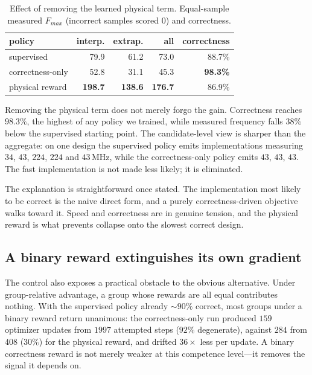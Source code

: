 \documentclass[journal]{IEEEtran}
\newcommand{\fmax}{$F_{\mathit{max}}$}
\begin{document}
\begin{table}[t]
\caption{Effect of removing the learned physical term. Equal-sample measured
\fmax{} (incorrect samples scored $0$) and correctness.}
\label{tab:ablation}
\centering
\small
\begin{tabular}{lrrrr}
\toprule
policy & interp. & extrap. & all & correctness \\
\midrule
supervised          &  79.9 &  61.2 &  73.0 & 88.7\% \\
correctness-only    &  52.8 &  31.1 &  45.3 & \textbf{98.3\%} \\
physical reward     & \textbf{198.7} & \textbf{138.6} & \textbf{176.7} & 86.9\% \\
\bottomrule
\end{tabular}
\end{table}

Removing the physical term does not merely forgo the gain. Correctness reaches
$98.3\%$, the highest of any policy we trained, while measured frequency falls
$38\%$ below the supervised starting point. The candidate-level view is
sharper than the aggregate: on one design the supervised policy emits
implementations measuring $34$, $43$, $224$, $224$ and $43$\,MHz, while the
correctness-only policy emits $43$, $43$, $43$. The fast implementation is not
made less likely; it is eliminated.

The explanation is straightforward once stated. The implementation most likely
to be correct is the naive direct form, and a purely correctness-driven
objective walks toward it. Speed and correctness are in genuine tension, and the
physical reward is what prevents collapse onto the slowest correct design.

\subsection{A binary reward extinguishes its own gradient}

The control also exposes a practical obstacle to the obvious alternative. Under
group-relative advantage, a group whose rewards are all equal contributes
nothing. With the supervised policy already $\sim\!\!90\%$ correct, most groups
under a binary reward return unanimous: the correctness-only run produced $159$
optimizer updates from $1997$ attempted steps ($92\%$ degenerate), against
$284$ from $408$ ($30\%$) for the physical reward, and drifted $36\times$ less
per update. A binary correctness reward is not merely weaker at this competence
level---it removes the signal it depends on.
\end{document}
